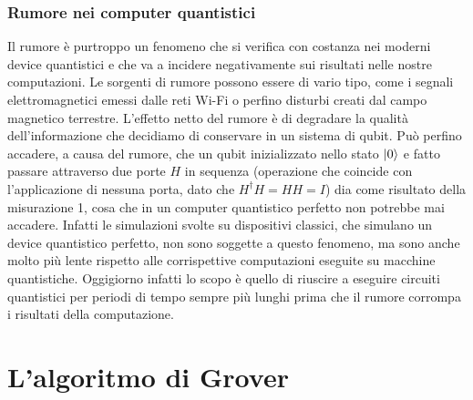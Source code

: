 \documentclass{book}
\theoremstyle{definition}
\theoremstyle{definition}
\theoremstyle{definition}
\theoremstyle{plain}
\theoremstyle{plain}
\theoremstyle{plain}
\theoremstyle{plain}
\begin{document}
\subsection{Rumore nei computer quantistici}
Il rumore è purtroppo un fenomeno che si verifica con costanza nei moderni device quantistici e che va a incidere negativamente sui risultati nelle nostre computazioni. Le sorgenti di rumore possono essere di vario tipo, come i segnali elettromagnetici emessi dalle reti Wi-Fi o perfino disturbi creati dal campo magnetico terrestre. L'effetto netto del rumore è di degradare la qualità dell'informazione che decidiamo di conservare in un sistema di qubit. Può perfino accadere, a causa del rumore, che un qubit inizializzato nello stato $\ket{0}$ e fatto passare attraverso due porte $H$ in sequenza (operazione che coincide con l'applicazione di nessuna porta, dato che $H^{\dagger}H=HH=I$) dia come risultato della misurazione 1, cosa che in un computer quantistico perfetto non potrebbe mai accadere. Infatti le simulazioni svolte su dispositivi classici, che simulano un device quantistico perfetto, non sono soggette a questo fenomeno, ma sono anche molto più lente rispetto alle corrispettive computazioni eseguite su macchine quantistiche. Oggigiorno infatti lo scopo è quello di riuscire a eseguire circuiti quantistici per periodi di tempo sempre più lunghi prima che il rumore corrompa i risultati della computazione. 

\chapter{L'algoritmo di Grover}
\end{document}
